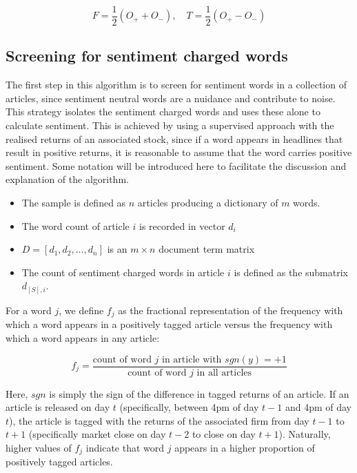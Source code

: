 \begin{equation}
F = \frac{1}{2}(O_+ + O_-), \quad T= \frac{1}{2}(O_+ - O_-)
\end{equation}

\subsection{Screening for sentiment charged words}
\label{screen-sentiment}
The first step in this algorithm is to screen for sentiment words in a collection of articles, since sentiment neutral words are a nuidance and contribute to noise. This strategy isolates the sentiment charged words and uses these alone to calculate sentiment. This is achieved by using a supervised approach with the realised returns of an associated stock, since if a word appears in headlines that result in positive returns, it is reasonable to assume that the word carries positive sentiment. Some notation will be introduced here to facilitate the discussion and explanation of the algorithm.
\begin{itemize}
      \item The sample is defined as $n$ articles producing a dictionary of $m$ words.
      \item The word count of article $i$ is recorded in vector $d_i$
      \item $D = [d_1, d_2, \dots, d_n]$ is an $m \times n$ document term matrix
      \item The count of sentiment charged words in article $i$ is defined as the submatrix $d_{[S],i}$.
\end{itemize}

For a word $j$, we define $f_j$ as the fractional representation of the frequency with which a word appears in a positively tagged article versus the frequency with which a word appears in any article:

\begin{equation}
f_j = \frac{\text{count of word } j \text{ in article with } sgn(y) = +1}{\text{count of word } j \text{ in all articles}}
\end{equation}

\noindent
Here, $sgn$ is simply the sign of the difference in tagged returns of an article. If an article is released on day $t$ (specifically, between 4pm of day $t-1$ and 4pm of day $t$), the article is tagged with the returns of the associated firm from day $t-1$ to $t+1$ (specifically market close on day $t-2$ to close on day $t+1$). Naturally, higher values of $f_j$ indicate that word $j$ appears in a higher proportion of positively tagged articles.

